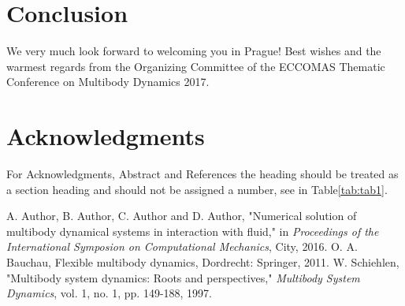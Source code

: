 \documentclass{mbd_fullpaper}
\begin{document}
\section{Conclusion}
We very much look forward to welcoming you in Prague! Best wishes and the warmest regards from the Organizing Committee of the ECCOMAS Thematic Conference on Multibody Dynamics 2017.

\section*{Acknowledgments}

For Acknowledgments, Abstract and References the heading should be treated as a section heading and should not be assigned a number, see in Table\ref{tab:tab1}.


\begin{thebibliography}{mbd}

A. Author, B. Author, C. Author and D. Author, "Numerical solution of multibody dynamical systems in interaction with fluid," in \textit{Proceedings of the International Symposion on Computational Mechanics}, City, 2016.
O. A. Bauchau, Flexible multibody dynamics, Dordrecht: Springer, 2011.
W. Schiehlen, "Multibody system dynamics: Roots and perspectives," \textit{Multibody System Dynamics}, vol. 1, no. 1, pp. 149-188, 1997.

\end{thebibliography}
\end{document}
